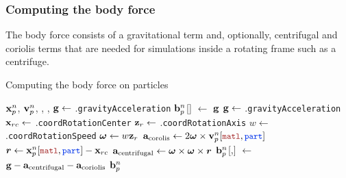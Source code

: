 \subsubsection{Computing the body force}
The body force consists of a gravitational term and, optionally, centrifugal and coriolis terms
that are needed for simulations inside a rotating frame such as a centrifuge.
\begin{breakablealgorithm}
  \caption{Computing the body force on particles}
  \begin{algorithmic}[1]
    \Require $\mathbf{x}_p^n$, $\mathbf{v}_p^n$, , , 
           \State $\mathbf{g} \leftarrow$ .\texttt{gravityAcceleration}
           \State $\mathbf{b}_p^{n}$[\TTmatl] $\leftarrow$ $\mathbf{g}$
        \Else
             \State $\mathbf{g} \leftarrow$ .\texttt{gravityAcceleration}
             \State $\mathbf{x}_{rc} \leftarrow$ .\texttt{coordRotationCenter}
             \State $\mathbf{z}_r \leftarrow$ .\texttt{coordRotationAxis}
             \State $w \leftarrow$ .\texttt{coordRotationSpeed}
             \State $\boldsymbol{\omega} \leftarrow w\mathbf{z}_r$
             \State $\Ba_{\text{corolis}} \leftarrow 2 \Bomega \times \Bv_p^{n}[\TTmatl,\TTpart]$
             \State $\Br \leftarrow \Bx_p^{n}[\TTmatl,\TTpart] - \Bx_{rc}$
             \State $\mathbf{a}_{\text{centrifugal}} \leftarrow \boldsymbol{\omega} \times \boldsymbol{\omega} \times \boldsymbol{r}$
             \State $\mathbf{b}_p^{n}$[\TTmatl,\TTpart] $\leftarrow$ 
                $\mathbf{g} -\mathbf{a}_{\text{centrifugal}} - \mathbf{a}_{\text{coriolis}}$
          \EndFor
        \EndIf
      \EndFor
      \State \Return $\mathbf{b}_p^{n}$
    \EndProcedure
  \end{algorithmic}
\end{breakablealgorithm}


